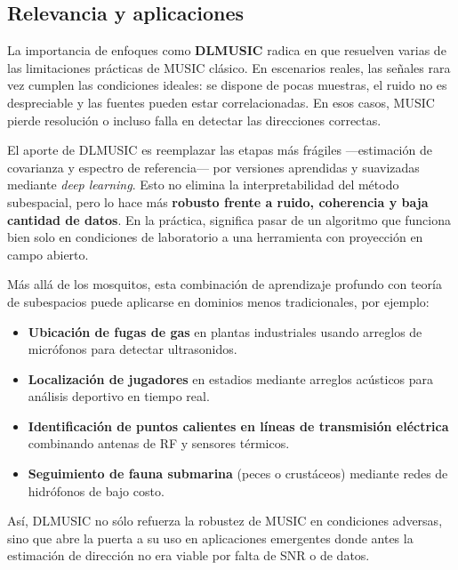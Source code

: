 \subsection{Relevancia y aplicaciones}

La importancia de enfoques como \textbf{DLMUSIC} radica en que resuelven varias de las limitaciones prácticas 
de MUSIC clásico.  
En escenarios reales, las señales rara vez cumplen las condiciones ideales: 
se dispone de pocas muestras, el ruido no es despreciable y las fuentes pueden estar correlacionadas.  
En esos casos, MUSIC pierde resolución o incluso falla en detectar las direcciones correctas.  

El aporte de DLMUSIC es reemplazar las etapas más frágiles —estimación de covarianza y espectro de referencia— 
por versiones aprendidas y suavizadas mediante \emph{deep learning}.  
Esto no elimina la interpretabilidad del método subespacial, pero lo hace más \textbf{robusto frente a ruido, 
	coherencia y baja cantidad de datos}.  
En la práctica, significa pasar de un algoritmo que funciona bien solo en condiciones de laboratorio 
a una herramienta con proyección en campo abierto.

Más allá de los mosquitos, esta combinación de aprendizaje profundo con teoría de subespacios 
puede aplicarse en dominios menos tradicionales, por ejemplo:
\begin{itemize}
	\item \textbf{Ubicación de fugas de gas} en plantas industriales usando arreglos de micrófonos para detectar ultrasonidos.  
	\item \textbf{Localización de jugadores} en estadios mediante arreglos acústicos para análisis deportivo en tiempo real.  
	\item \textbf{Identificación de puntos calientes en líneas de transmisión eléctrica} combinando antenas de RF y sensores térmicos.  
	\item \textbf{Seguimiento de fauna submarina} (peces o crustáceos) mediante redes de hidrófonos de bajo costo.  
\end{itemize}

Así, DLMUSIC no sólo refuerza la robustez de MUSIC en condiciones adversas, 
sino que abre la puerta a su uso en aplicaciones emergentes donde antes la estimación de dirección 
no era viable por falta de SNR o de datos.
